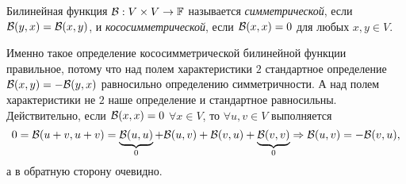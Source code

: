\begin{definition}
    Билинейная функция $\mathcal{B}: V \times V \to \mathbb{F}$ называется \textit{симметрической}, если $\mathcal{B}(y, x) = \mathcal{B}(x, y)$, и \textit{кососимметрической}, если $\mathcal{B}(x, x) = 0$ для любых $x, y \in V$.
\end{definition}

\begin{remark}
    Именно такое определение кососимметрической билинейной функции правильное, потому что над полем характеристики $2$ стандартное определение $\mathcal{B}(x, y) = -\mathcal{B}(y, x)$ равносильно определению симметричности. А над полем характеристики не $2$ наше определение и стандартное равносильны. Действительно, если $\mathcal{B}(x, x) = 0$ $\forall x \in V$, то $\forall u, v \in V$ выполняется
    \[
        0 = \mathcal{B}(u + v, u + v) = \underbrace{\mathcal{B}(u, u)}_{0} + \mathcal{B}(u, v) + \mathcal{B}(v, u) + \underbrace{\mathcal{B}(v, v)}_{0} \Rightarrow \mathcal{B}(u, v) = -\mathcal{B}(v, u),
    \]
    а в обратную сторону очевидно.
\end{remark}

